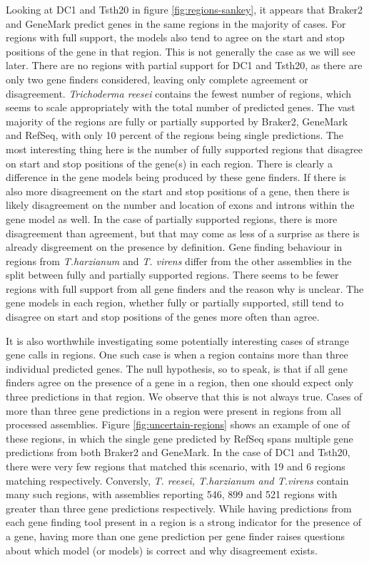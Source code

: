 Looking at DC1 and Tsth20 in figure \ref{fig:regions-sankey}, it
appears that Braker2 and GeneMark predict genes in the same regions in
the majority of cases. For regions with full support, the models also
tend to agree on the start and stop positions of the gene in that
region. This is not generally the case as we will see later. There are
no regions with partial support for DC1 and Tsth20, as there are only
two gene finders considered, leaving only complete agreement or
disagreement. \textit{Trichoderma reesei} contains the fewest number of
regions, which seems to scale appropriately with the total number of
predicted genes. The vast majority of the regions are fully or
partially supported by Braker2, GeneMark and RefSeq, with only 10
percent of the regions being single predictions. The most interesting
thing here is the number of fully supported regions that disagree on
start and stop positions of the gene(s) in each region. There is
clearly a difference in the gene models being produced by these gene
finders. If there is also more disagreement on the start and stop
positions of a gene, then there is likely disagreement on the number
and location of exons and introns within the gene model as well. In
the case of partially supported regions, there is more disagreement
than agreement, but that may come as less of a surprise as there is
already disgreement on the presence by definition. Gene finding
behaviour in regions from \textit{T.harzianum} and \textit{T. virens}
differ from the other assemblies in the split between fully and
partially supported regions. There seems to be fewer regions with full
support from all gene finders and the reason why is unclear. The gene
models in each region, whether fully or partially supported, still
tend to disagree on start and stop positions of the genes more often
than agree.

It is also worthwhile investigating some potentially interesting cases
of strange gene calls in regions. One such case is when a region
contains more than three individual predicted genes. The null
hypothesis, so to speak, is that if all gene finders agree on the
presence of a gene in a region, then one should expect only three
predictions in that region. We observe that this is not always
true. Cases of more than three gene predictions in a region were
present in regions from all processed assemblies. Figure
\ref{fig:uncertain-regions} shows an example of one of these regions,
in which the single gene predicted by RefSeq spans multiple gene
predictions from both Braker2 and GeneMark. In the case of DC1 and
Tsth20, there were very few regions that matched this scenario, with
19 and 6 regions matching respectively. Conversly, \textit{T. reesei,
  T.harzianum and T.virens} contain many such regions, with assemblies
reporting 546, 899 and 521 regions with greater than three gene
predictions respectively. While having predictions from each gene
finding tool present in a region is a strong indicator for the
presence of a gene, having more than one gene prediction per gene
finder raises questions about which model (or models) is correct and
why disagreement exists.


